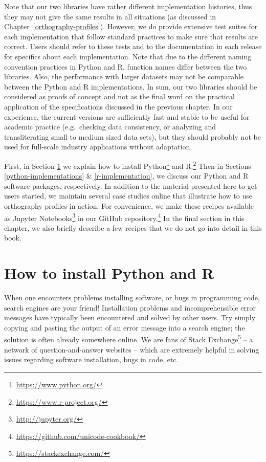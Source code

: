 \documentclass[output=book,nonflat,modfonts,
citecolor=brown,
		]{langsci/langscibook}\usepackage[]{graphicx}\usepackage[]{color}
\begin{document}
Note that our two libraries have rather different implementation histories, thus they may not give the same results in all situations (as discussed in Chapter~\ref{orthography-profiles}). However, we do provide extensive test suites for each implementation that follow standard practices to make sure that results are correct. Users should refer to these tests and to the documentation in each release for specifics about each implementation. Note that due to the different naming convention practices in Python and R, function names differ between the two libraries. Also, the performance with larger datasets may not be comparable between the Python and R implementations. In sum, our two libraries should be considered as proofs of concept and not as the final word on the practical application of the specifications discussed in the previous chapter. In our experience, the current versions are sufficiently fast and stable to be useful for academic practice (e.g.\ checking data consistency, or analyzing and transliterating small to medium sized data sets), but they should probably not be used for full-scale industry applications without adaptation.

First, in Section \ref{installing-python-and-r} we explain how to install Python\footnote{\url{https://www.python.org/}} and R.\footnote{\url{https://www.r-project.org/}} Then in Sections \ref{python-implementations} \& \ref{r-implementation}, we discuss our Python and R software packages, respectively. In addition to the material presented here to get users started, we maintain several case studies online that illustrate how to use orthography profiles in action. For convenience, we make these recipes available as Jupyter Notebooks\footnote{\url{http://jupyter.org/}} in our GitHub repository.\footnote{\url{https://github.com/unicode-cookbook/}} In the final section in this chapter, we also briefly describe a few recipes that we do not go into detail in this book.

\section{How to install Python and R}
\label{installing-python-and-r}

When one encounters problems installing software, or bugs in programming code, search engines are your friend! Installation problems and incomprehensible error messages have typically been encountered and solved by other users. Try simply copying and pasting the output of an error message into a search engine; the solution is often already somewhere online. We are fans of Stack Exchange\footnote{\url{https://stackexchange.com/}} -- a network of question-and-answer websites -- which are extremely helpful in solving issues regarding software installation, bugs in code, etc.
\end{document}
